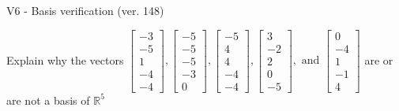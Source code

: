 \begin{exercise}
  \begin{exerciseTitle}V6 - Basis verification (ver. 148)\end{exerciseTitle}
  \begin{exerciseStatement}
    Explain why the vectors \(\left[\begin{array}{r}
-3 \\
-5 \\
1 \\
-4 \\
-4
\end{array}\right] , \left[\begin{array}{r}
-5 \\
-5 \\
-5 \\
-3 \\
0
\end{array}\right] , \left[\begin{array}{r}
-5 \\
4 \\
4 \\
-4 \\
-4
\end{array}\right] , \left[\begin{array}{r}
3 \\
-2 \\
2 \\
0 \\
-5
\end{array}\right] , \text{ and } \left[\begin{array}{r}
0 \\
-4 \\
1 \\
-1 \\
4
\end{array}\right]\) are or are not a basis of \(\mathbb{R}^5\)	



\end{exerciseStatement}
\end{exercise}
